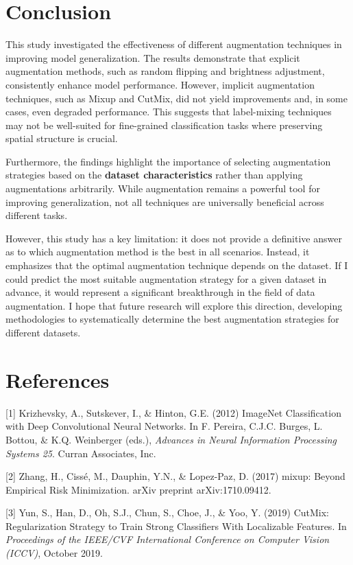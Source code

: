 \documentclass{article}
\begin{document}
\section{Conclusion}
\label{others}


This study investigated the effectiveness of different augmentation techniques in improving model generalization. The results demonstrate that explicit augmentation methods, such as random flipping and brightness adjustment, consistently enhance model performance. However, implicit augmentation techniques, such as Mixup and CutMix, did not yield improvements and, in some cases, even degraded performance. This suggests that label-mixing techniques may not be well-suited for fine-grained classification tasks where preserving spatial structure is crucial.

Furthermore, the findings highlight the importance of selecting augmentation strategies based on the {\bf dataset characteristics} rather than applying augmentations arbitrarily. While augmentation remains a powerful tool for improving generalization, not all techniques are universally beneficial across different tasks.

However, this study has a key limitation: it does not provide a definitive answer as to which augmentation method is the best in all scenarios. Instead, it emphasizes that the optimal augmentation technique depends on the dataset. If I could predict the most suitable augmentation strategy for a given dataset in advance, it would represent a significant breakthrough in the field of data augmentation. I hope that future research will explore this direction, developing methodologies to systematically determine the best augmentation strategies for different datasets.


\section*{References}


\medskip

[1] Krizhevsky, A., Sutskever, I., \& Hinton, G.E. (2012) ImageNet Classification with Deep Convolutional Neural Networks. In F. Pereira, C.J.C. Burges, L. Bottou, \& K.Q. Weinberger (eds.), {\it Advances in Neural Information Processing Systems 25}. Curran Associates, Inc.


[2] Zhang, H., Cissé, M., Dauphin, Y.N., \& Lopez-Paz, D. (2017) mixup: Beyond Empirical Risk Minimization. arXiv preprint arXiv:1710.09412.

[3] Yun, S., Han, D., Oh, S.J., Chun, S., Choe, J., \& Yoo, Y. (2019) CutMix: Regularization Strategy to Train Strong Classifiers With Localizable Features. In {\it Proceedings of the IEEE/CVF International Conference on Computer Vision (ICCV)}, October 2019.
\end{document}
